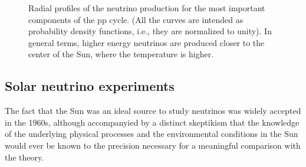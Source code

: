 \begin{figure}[!htbp]
  
  \caption{Radial profiles of the neutrino production for the most important
  components of the pp cycle. (All the curves are intended as probability density
  functions, i.e., they are normalized to unity). In general terms, higher energy
  neutrinos are produced closer to the center of the Sun, where the temperature
  is higher.}
  \label{fig:sun_neutrino_location}
\end{figure}



\subsection{Solar neutrino experiments}

The fact that the Sun was an ideal source to study neutrinos was widely accepted in
the 1960s, although accompanyied by a distinct skeptikism that the knowledge of the
underlying physical processes and the environmental conditions in the Sun would
ever be known to the precision necessary for a meaningful comparison with the theory.

